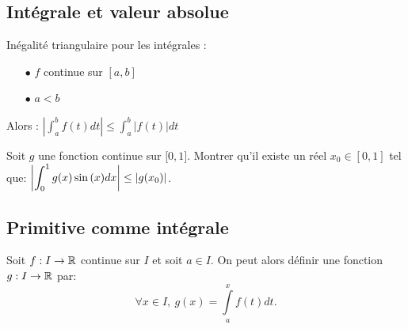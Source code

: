 \documentclass[a4paper, 11pt]{article}
\begin{document}
{{{%
\subsection{Int\'egrale et valeur absolue}


{

	\begin{theorem} Inégalité triangulaire pour les intégrales :
		\begin{itemize}
			\item[$\bullet$] $f$ continue sur $[a,b]$
			\item[$\bullet$] $a<b$
		\end{itemize}
		Alors : $\left| \int_a^b f(t) dt \right| \leq \int_a^b \left|f(t)\right| dt$
	\end{theorem}
}

{\footnotesize \begin{exo}
		Soit $g$ une fonction continue sur $\lbrack 0,1\rbrack$. Montrer qu'il existe un r\'eel $x_0 \in [0,1]$ tel que: $\left|  \displaystyle\int_0^1 g(x)\sin{(x)} dx  \right| \leq |g(x_0)| $.
	\end{exo}}


\subsection{Primitive comme intégrale}
Soit $f: I\rightarrow \mathbb{R}$ continue sur $I$ et soit $a\in I$. On peut alors d\'efinir une fonction $g: I\rightarrow \mathbb{R}$ par:
$$\forall x\in I,\ g(x)=\int\limits_a^x f(t)dt. $$


}}}
\end{document}
